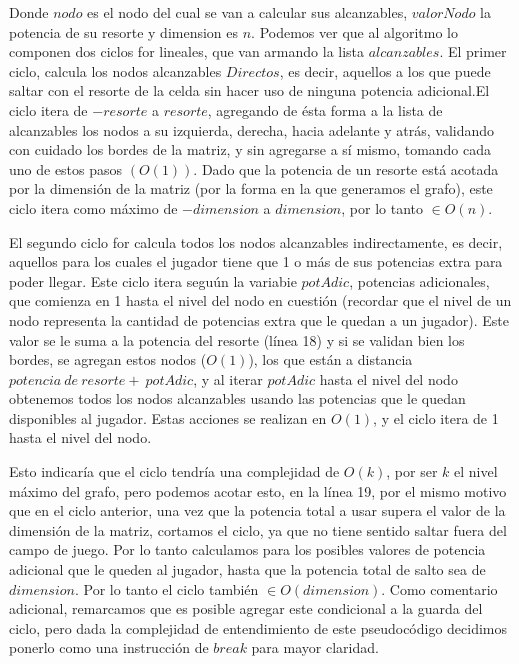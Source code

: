 \vspace{2mm}

Donde $nodo$ es el nodo del cual se van a calcular sus alcanzables, $valorNodo$ la potencia de su resorte y dimension es $n$. Podemos ver que al algoritmo lo componen dos ciclos for lineales, que van armando la lista $alcanzables$. El primer ciclo, calcula los nodos alcanzables $Directos$, es decir, aquellos a los que puede saltar con el resorte de la celda sin hacer uso de ninguna potencia adicional.El ciclo itera de $-resorte$ a $resorte$, agregando de \'esta forma a la lista de alcanzables los nodos a su izquierda, derecha, hacia adelante y atr\'as, validando con cuidado los bordes de la matriz, y sin agregarse a s\'i mismo, tomando cada uno de estos pasos $(O(1))$. Dado que la potencia de un resorte est\'a acotada por la dimensi\'on de la matriz (por la forma en la que generamos el grafo), este ciclo itera como m\'aximo de $-dimension$ a $dimension$, por lo tanto $\in O(n)$. 

\vspace{2mm}

El segundo ciclo for calcula todos los nodos alcanzables indirectamente, es decir, aquellos para los cuales el jugador tiene que 1 o m\'as de sus potencias extra para poder llegar. Este ciclo itera segu\'un la variabie $potAdic$, potencias adicionales, que comienza en 1 hasta el nivel del nodo en cuesti\'on (recordar que el nivel de un nodo representa la cantidad de potencias extra que le quedan a un jugador). Este valor se le suma a la potencia del resorte (l\'inea 18) y si se validan bien los bordes, se agregan estos nodos ($O(1)$), los que est\'an a distancia $potencia \: de \: resorte + \: potAdic$, y al iterar $potAdic$ hasta el nivel del nodo obtenemos todos los nodos alcanzables usando las potencias que le quedan disponibles al jugador. Estas acciones se realizan en $O(1)$, y el ciclo itera de 1 hasta el nivel del nodo.

\vspace{2mm}

 Esto indicar\'ia que el ciclo tendr\'ia una complejidad de $O(k)$, por ser $k$ el nivel m\'aximo del grafo, pero podemos acotar esto, en la l\'inea 19, por el mismo motivo que en el ciclo anterior, una vez que la potencia total a usar supera el valor de la dimensi\'on de la matriz, cortamos el ciclo, ya que no tiene sentido saltar fuera del campo de juego. Por lo tanto calculamos para los posibles valores de potencia adicional que le queden al jugador, hasta que la potencia total de salto sea de $dimension$. Por lo tanto el ciclo tambi\'en $\in O(dimension)$. Como comentario adicional, remarcamos que es posible agregar este condicional a la guarda del ciclo, pero dada la complejidad de entendimiento de este pseudoc\'odigo decidimos ponerlo como una instrucci\'on de $break$ para mayor claridad.

